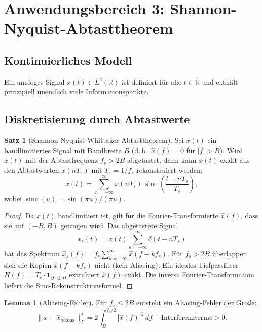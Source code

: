 ﻿\documentclass[a4paper,12pt]{article}
\theoremstyle{definition}
\newtheorem{satz}{Satz}
\newtheorem{lemma}{Lemma}
\begin{document}
\section{Anwendungsbereich 3: Shannon-Nyquist-Abtasttheorem}

\subsection{Kontinuierliches Modell}

Ein analoges Signal $x(t) \in L^2(\mathbb{R})$ ist definiert für alle $t \in \mathbb{R}$ und enthält prinzipiell unendlich viele Informationspunkte.

\subsection{Diskretisierung durch Abtastwerte}

\begin{satz}[Shannon-Nyquist-Whittaker Abtasttheorem]
    Sei $x(t)$ ein bandlimitiertes Signal mit Bandbreite $B$ (d.\,h.\ $\hat{x}(f) = 0$ für $|f| > B$). Wird $x(t)$ mit der Abtastfrequenz $f_s > 2B$ abgetastet, dann kann $x(t)$ exakt aus den Abtastwerten $x(nT_s)$ mit $T_s = 1/f_s$ rekonstruiert werden:
    \[
    x(t) = \sum_{n=-\infty}^{\infty} x(nT_s)\,\operatorname{sinc}\!\left(\frac{t - nT_s}{T_s}\right),
    \]
    wobei $\operatorname{sinc}(u) = \sin(\pi u)/(\pi u)$.
\end{satz}

\begin{proof}
    Da $x(t)$ bandlimitiert ist, gilt für die Fourier-Transformierte $\hat{x}(f)$, dass sie auf $(-B, B)$ getragen wird. Das abgetastete Signal
    \[
    x_s(t) = x(t)\sum_{n=-\infty}^\infty \delta(t - nT_s)
    \]
    hat das Spektrum $\hat{x}_s(f) = f_s \sum_{k=-\infty}^\infty \hat{x}(f - kf_s)$. Für $f_s > 2B$ überlappen sich die Kopien $\hat{x}(f - kf_s)$ nicht (kein Aliasing). Ein ideales Tiefpassfilter $H(f) = T_s \cdot \mathbf{1}_{|f|\leq B}$ extrahiert $\hat{x}(f)$ exakt. Die inverse Fourier-Transformation liefert die Sinc-Rekonstruktionsformel. \qedhere
\end{proof}

\begin{lemma}[Aliasing-Fehler]
    Für $f_s \leq 2B$ entsteht ein Aliasing-Fehler der Größe:
    \[
    \|x - \hat{x}_{\text{rekons}}\|_2^2 = 2\int_B^{f_s/2} |\hat{x}(f)|^2\,df + \text{Interferenzterme} > 0.
    \]
\end{lemma}
\end{document}

